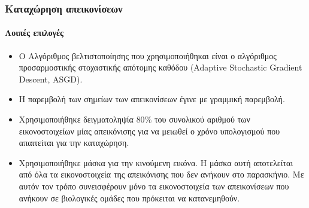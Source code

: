 \documentclass{beamer}
\begin{document}
\begin{frame}
\frametitle{Καταχώρηση απεικονίσεων}
\framesubtitle{Λοιπές επιλογές}

\begin{itemize}
    \item<1-> Ο Αλγόριθμος βελτιστοποίησης που χρησιμοποιήθηκαι είναι ο
        αλγόριθμος προσαρμοστικής στοχαστικής απότομης καθόδου (Adaptive
        Stochastic Gradient Descent, ASGD).
    \item<2-> Η παρεμβολή των σημείων των απεικονίσεων έγινε με γραμμική
        παρεμβολή.
    \item<3-> Χρησιμοποιήθηκε δειγματοληψία $80\%$ του συνολικού αριθμού των
        εικονοστοιχείων μίας απεικόνισης για να μειωθεί ο χρόνο υπολογισμού που
        απαιτείται για την καταχώρηση.
    \item<4-> Χρησιμοποιήθηκε μάσκα για την κινούμενη εικόνα. Η μάσκα αυτή
        αποτελείται από όλα τα εικονοστοιχεία της απεικόνισης που δεν ανήκουν
        στο παρασκήνιο. Με αυτόν τον τρόπο συνεισφέρουν μόνο τα εικονοστοιχεία
        των απεικονίσεων που ανήκουν σε βιολογικές ομάδες που πρόκειται να
        κατανεμηθούν.
\end{itemize}

\end{frame}
\end{document}
